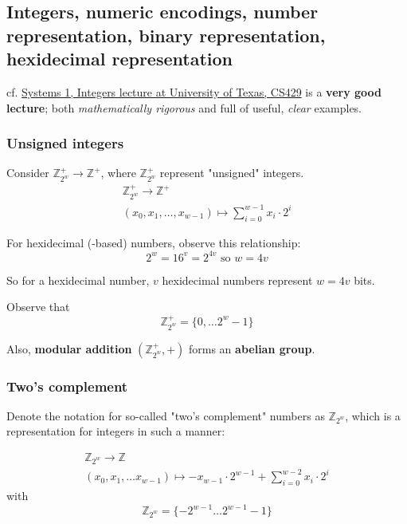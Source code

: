 \documentclass[10pt]{amsart}
\begin{document}
\begin{multicols*}{2}
\part{Integers, numeric encodings, number representation, binary representation, hexidecimal representation}

cf. \href{https://www.cs.utexas.edu/users/fussell/courses/cs429h/lectures/Lecture_3-429h.pdf}{Systems 1, Integers lecture at University of Texas, CS429} is a \textbf{very good lecture}; both \emph{mathematically rigorous} and full of useful, \emph{clear} examples.

\section{Unsigned integers}

Consider $\mathbb{Z}^+_{2^w} \to \mathbb{Z}^+$, where $\mathbb{Z}^+_{2^w}$ represent "unsigned" integers. 
\begin{equation}
\begin{gathered}
\mathbb{Z}^+_{2^w} \to \mathbb{Z}^+ \\ 
(x_0, x_1 , \dots , x_{w-1}) \mapsto \sum_{i=0}^{w-1} x_i \cdot 2^i 
\end{gathered}
\end{equation}

For hexidecimal (-based) numbers, observe this relationship: 
\begin{equation}
2^w = 16^v = 2^{4v} \text{ so } w =4v
\end{equation}

So for a hexidecimal number, $v$ hexidecimal numbers represent $w=4v$ bits. 

Observe that 
\begin{equation}
\mathbb{Z}^+_{2^w} = \lbrace 0 , \dots 2^w - 1 \rbrace 
\end{equation}

Also, \textbf{modular addition} $(\mathbb{Z}^+_{2^w}, +)$ forms an \textbf{abelian group}.

\section{Two's complement}

Denote the notation for so-called "two's complement" numbers as $\mathbb{Z}_{2^w}$, which is a representation for integers in such a manner:

\begin{equation}
\begin{gathered}
\mathbb{Z}_{2^w} \to \mathbb{Z} \\
(x_0, x_1, \dots x_{w-1}) \mapsto -x_{w-1} \cdot 2^{w-1} + \sum_{i=0}^{w-2} x_i \cdot 2^i
\end{gathered}
\end{equation}
with
\begin{equation}
\mathbb{Z}_{2^w} = \lbrace - 2^{w-1} \dots 2^{w-1} -1 \rbrace
\end{equation}


\end{multicols*}
\end{document}
